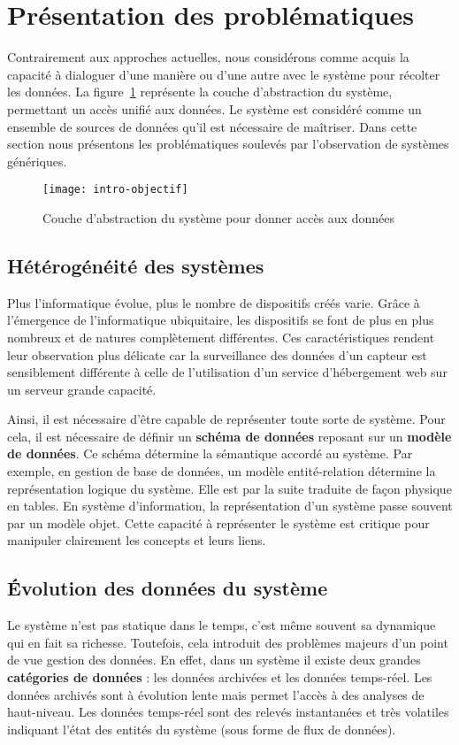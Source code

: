 \section{Présentation des problématiques}\label{sec:intro:problematique}
Contrairement aux approches actuelles, nous considérons comme acquis la capacité à dialoguer d'une manière ou d'une autre avec le système pour récolter les données. La figure~\ref{fig:intro:objectif:abstraction} représente la couche d'abstraction du système, permettant un accès unifié aux données. Le système est considéré comme un ensemble de sources de données qu'il est nécessaire de maîtriser. Dans cette section nous présentons les problématiques soulevés par l'observation de systèmes génériques.

\begin{figure}[ht]
\centering
\texttt{[image: intro-objectif]}
\caption{Couche d'abstraction du système pour donner accès aux données}\label{fig:intro:objectif:abstraction}
\end{figure}

\subsection{Hétérogénéité des systèmes}
Plus l'informatique évolue, plus le nombre de dispositifs créés varie. Grâce à l'émergence de l'informatique ubiquitaire, les dispositifs se font de plus en plus nombreux et de natures complètement différentes. Ces caractéristiques rendent leur observation plus délicate car la surveillance des données d'un capteur est sensiblement différente à celle de l'utilisation d'un service d'hébergement web sur un serveur grande capacité.

Ainsi, il est nécessaire d'être capable de représenter toute sorte de système. Pour cela, il est nécessaire de définir un \textbf{schéma de données} reposant sur un \textbf{modèle de données}. Ce schéma détermine la sémantique accordé au système. Par exemple, en gestion de base de données, un modèle entité-relation détermine la représentation logique du système. Elle est par la suite traduite de façon physique en tables. En système d'information, la représentation d'un système passe souvent par un modèle objet. Cette capacité à représenter le système est critique pour manipuler clairement les concepts et leurs liens.

\subsection{Évolution des données du système}
Le système n'est pas statique dans le temps, c'est même souvent sa dynamique qui en fait sa richesse. Toutefois, cela introduit des problèmes majeurs d'un point de vue gestion des données. En effet, dans un système il existe deux grandes \textbf{catégories de données} : les données archivées et les données temps-réel. Les données archivés sont à évolution lente mais permet l'accès à des analyses de haut-niveau. Les données temps-réel sont des relevés instantanées et très volatiles indiquant l'état des entités du système (sous forme de flux de données).

